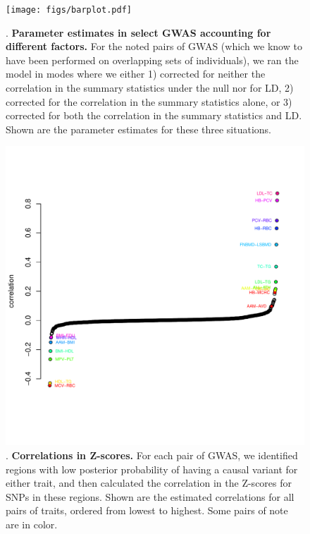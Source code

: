\documentclass[11pt,titlepage]{article}
\begin{document}
\begin{figure}
\begin{center}
\texttt{[image: figs/barplot.pdf]}
\caption{. \textbf{Parameter estimates in select GWAS accounting for different factors.} For the noted pairs of GWAS (which we know to have been performed on overlapping sets of individuals), we ran the model in modes where we either 1) corrected for neither the correlation in the summary statistics under the null nor for LD, 2) corrected for the correlation in the summary statistics alone, or 3) corrected for both the correlation in the summary statistics and LD. Shown are the parameter estimates for these three situations.}\label{f_barplot}
\end{center}
\end{figure}

\begin{figure}
\begin{center}
\includegraphics[scale = 0.6]{figs/cor.pdf}
\caption{. \textbf{Correlations in Z-scores.} For each pair of GWAS, we identified regions with low posterior probability of having a causal variant for either trait, and then calculated the correlation in the Z-scores for SNPs in these regions. Shown are the estimated correlations for all pairs of traits, ordered from lowest to highest. Some pairs of note are in color.}\label{f_cor}
\end{center}
\end{figure}
\end{document}
